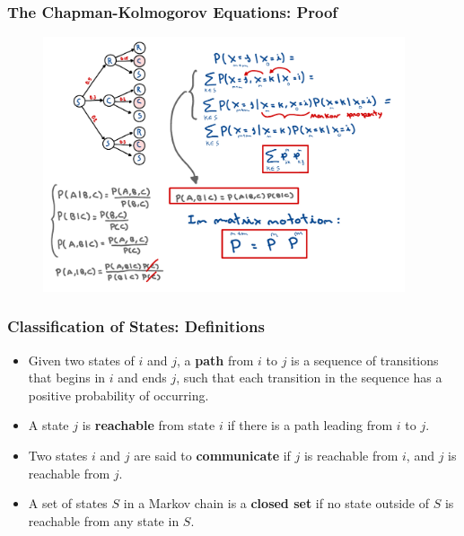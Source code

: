 \begin{frame}
    \frametitle{The Chapman-Kolmogorov Equations: Proof}
        \begin{figure}
            \centering
            \includegraphics[width=0.95\textwidth]{slides/figures/chapman_kolmogorov_proof.pdf}
        \end{figure}
\end{frame}


\begin{frame}
    \frametitle{Classification of States: Definitions}
    \begin{itemize}

        \item Given two states of $i$ and $j$, a \textbf{path} from $i$ to $j$ is a sequence of 
        transitions that begins in $i$ and ends $j$, such that each transition in the sequence
        has a positive probability of occurring.

        \item A state $j$ is \textbf{reachable} from state $i$ if there is a path leading from $i$ to $j$.

        \item Two states $i$ and $j$ are said to \textbf{communicate} if $j$ is reachable
        from $i$, and $j$ is reachable from $j$.

        \item A set of states $S$ in a Markov chain is a \textbf{closed set} if no state outside
        of $S$ is reachable from any state in $S$.

    \end{itemize}
\end{frame}

